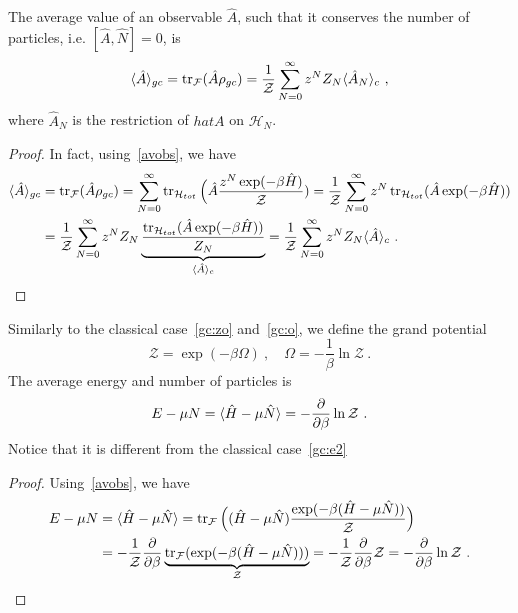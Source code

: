     The average value of an observable $\hat A$, such that it conserves the number of particles, i.e. $[\hat A, \hat N] = 0$, is
    \begin{equation*}
        \langle\hat A\rangle_{gc} = \operatorname{tr}_{\mathcal F} (\hat A \rho_{gc}) = \frac{1}{\mathcal Z} \sum_{N=0}^{\infty} z^N Z_N \langle\hat A_N\rangle_c ~,
    \end{equation*}
    where $\hat A_N$ is the restriction of $hat A$ on $\mathcal H_N$.
    \begin{proof}
        In fact, using~\eqref{avobs}, we have
        \begin{equation*}
        \begin{aligned}
            \langle\hat A\rangle_{gc} & = \operatorname{tr}_{\mathcal F} (\hat A \rho_{gc}) = \sum_{N=0}^{\infty} \operatorname{tr}_{\mathcal H_{tot}} \Big (\hat A \frac{z^N \exp(- \beta \hat H)}{\mathcal Z}) = \frac{1}{\mathcal Z} \sum_{N=0}^{\infty} z^N \operatorname{tr}_{\mathcal H_{tot}} (\hat A \exp(- \beta \hat H)) \\ & = \frac{1}{\mathcal Z} \sum_{N=0}^{\infty} z^N Z_N \underbrace{\frac{\operatorname{tr}_{\mathcal H_{tot}} (\hat A \exp(- \beta \hat H))}{Z_N}}_{\langle\hat A\rangle_c} = \frac{1}{\mathcal Z} \sum_{N=0}^{\infty} z^N Z_N \langle\hat A\rangle_c ~.
        \end{aligned}
        \end{equation*}
    \end{proof}
    
    Similarly to the classical case~\eqref{gc:zo} and~\eqref{gc:o}, we define the grand potential 
    \begin{equation*}
        \mathcal Z = \exp(- \beta \Omega) ~, \quad \Omega = - \frac{1}{\beta} \ln \mathcal Z ~.
    \end{equation*}
    The average energy and number of particles is
    \begin{equation*}
        E - \mu N = \langle\hat H - \mu \hat N\rangle = - \frac{\partial}{\partial\beta} \ln \mathcal Z ~.
    \end{equation*}
    Notice that it is different from the classical case~\eqref{gc:e2}
    \begin{proof}
        Using~\eqref{avobs}, we have
        \begin{equation*}
        \begin{aligned}
            E - \mu N & = \langle\hat H - \mu \hat N\rangle  = \operatorname{tr}_{\mathcal F} \Big ( (\hat H - \mu \hat N) \frac{\exp( - \beta (\hat H - \mu \hat N))}{\mathcal Z} \Big) \\ & = - \frac{1}{\mathcal Z} \frac{\partial}{\partial\beta} \underbrace{\operatorname{tr}_{\mathcal F} (\exp(- \beta (\hat H - \mu \hat N)))}_{\mathcal Z} = - \frac{1}{\mathcal Z} \frac{\partial}{\partial\beta} \mathcal Z  = - \frac{\partial}{\partial\beta} \ln \mathcal Z ~.
        \end{aligned}
        \end{equation*}
    \end{proof}

